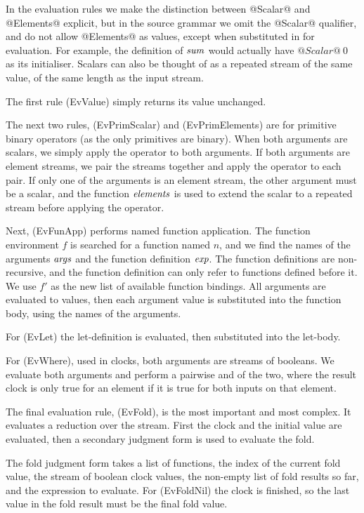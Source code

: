  In the evaluation rules we make the distinction between @Scalar@ and @Elements@ explicit, but in the source grammar we omit the @Scalar@ qualifier, and do not allow @Elements@ as values, except when substituted in for evaluation.
For example, the definition of $\mathit{sum}$ would actually have $@Scalar@~0$ as its initialiser.
Scalars can also be thought of as a repeated stream of the same value, of the same length as the input stream.

The first rule (EvValue) simply returns its value unchanged.

The next two rules, (EvPrimScalar) and (EvPrimElements) are for primitive binary operators (as the only primitives are binary).
When both arguments are scalars, we simply apply the operator to both arguments.
If both arguments are element streams, we pair the streams together and apply the operator to each pair.
If only one of the arguments is an element stream, the other argument must be a scalar, and the function $\mathit{elements}$ is used to extend the scalar to a repeated stream before applying the operator.

Next, (EvFunApp) performs named function application.
The function environment $f$ is searched for a function named $n$, and we find the names of the arguments $\mathit{args}$ and the function definition $\mathit{exp}$.
The function definitions are non-recursive, and the function definition can only refer to functions defined before it.
We use $f'$ as the new list of available function bindings.
All arguments are evaluated to values, then each argument value is substituted into the function body, using the names of the arguments.

For (EvLet) the let-definition is evaluated, then substituted into the let-body.

For (EvWhere), used in clocks, both arguments are streams of booleans.
We evaluate both arguments and perform a pairwise and of the two, where the result clock is only true for an element if it is true for both inputs on that element.

The final evaluation rule, (EvFold), is the most important and most complex.
It evaluates a reduction over the stream.
First the clock and the initial value are evaluated, then a secondary judgment form is used to evaluate the fold.

The fold judgment form takes a list of functions, the index of the current fold value, the stream of boolean clock values, the non-empty list of fold results so far, and the expression to evaluate.
For (EvFoldNil) the clock is finished, so the last value in the fold result must be the final fold value.

